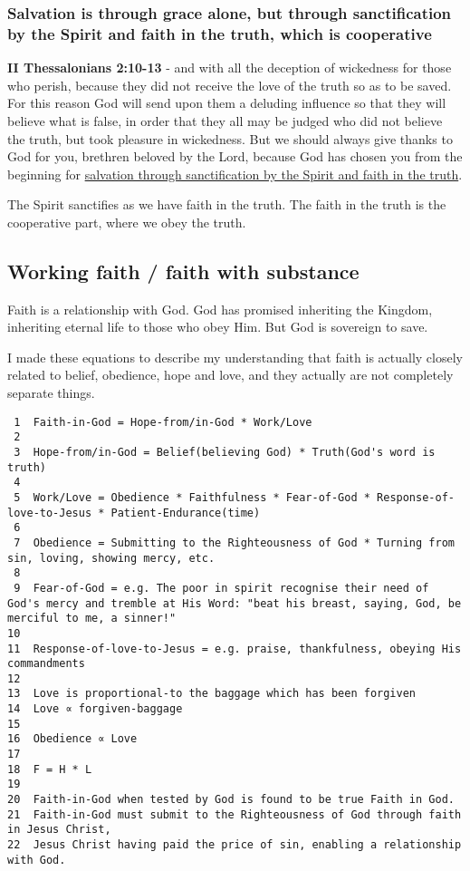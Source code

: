 \documentclass[11pt]{article}
\begin{document}
\subsubsection{Salvation is through grace alone, but through sanctification by the Spirit and faith in the truth, which is cooperative}
\label{sec:orgb666d47}

\textbf{II Thessalonians 2:10-13} - and with all the deception of wickedness for those who perish, because they did not receive the love of the truth so as to be saved. For this reason God will send upon them a deluding influence so that they will believe what is false, in order that they all may be judged who did not believe the truth, but took pleasure in wickedness. But we should always give thanks to God for you, brethren beloved by the Lord, because God has chosen you from the beginning for \uline{salvation through sanctification by the Spirit and faith in the truth}.

The Spirit sanctifies as we have faith in the truth.
The faith in the truth is the cooperative part, where we obey the truth.

\subsection{Working faith / faith with substance}
\label{sec:org2e2bfea}

Faith is a relationship with God. God has promised inheriting the Kingdom, inheriting eternal life to those who obey Him. But God is sovereign to save.

I made these equations to describe my understanding that faith is actually closely related to belief, obedience, hope and love, and they actually are not completely separate things.

\begin{verbatim}
 1  Faith-in-God = Hope-from/in-God * Work/Love
 2  
 3  Hope-from/in-God = Belief(believing God) * Truth(God's word is truth)
 4  
 5  Work/Love = Obedience * Faithfulness * Fear-of-God * Response-of-love-to-Jesus * Patient-Endurance(time)
 6  
 7  Obedience = Submitting to the Righteousness of God * Turning from sin, loving, showing mercy, etc.
 8  
 9  Fear-of-God = e.g. The poor in spirit recognise their need of God's mercy and tremble at His Word: "beat his breast, saying, God, be merciful to me, a sinner!"
10  
11  Response-of-love-to-Jesus = e.g. praise, thankfulness, obeying His commandments
12  
13  Love is proportional-to the baggage which has been forgiven
14  Love ∝ forgiven-baggage
15  
16  Obedience ∝ Love
17  
18  F = H * L
19  
20  Faith-in-God when tested by God is found to be true Faith in God.
21  Faith-in-God must submit to the Righteousness of God through faith in Jesus Christ,
22  Jesus Christ having paid the price of sin, enabling a relationship with God.
\end{verbatim}
\end{document}
